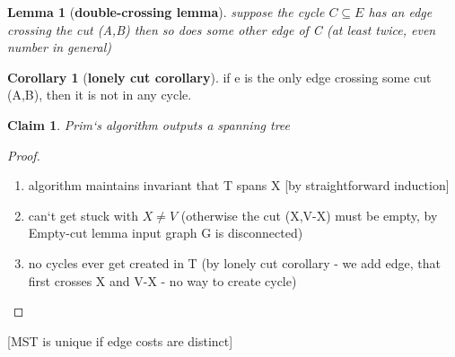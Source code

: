 \documentclass[a4paper,12pt]{article}
\theoremstyle{plain}
\newtheorem*{lemma}{Lemma}
\newtheorem{claim}{Claim}
\theoremstyle{definition}
\newtheorem*{corollary}{Corollary}
\theoremstyle{remark}
\begin{document}
\begin{lemma}[\textbf{double-crossing lemma}] suppose the cycle $C \subseteq E$ has an edge crossing the cut (A,B) then so does some other edge of C (at least twice, even number in general)\end{lemma}

\begin{corollary}[\textbf{lonely cut corollary}] if e is the only edge crossing some cut (A,B), then it is not in any cycle.\end{corollary}

\begin{claim} Prim`s algorithm outputs a spanning tree\end{claim}
\begin{proof}
\begin{enumerate}
	\item algorithm maintains invariant that T spans X [by straightforward induction]
	\item can`t get stuck with $X \neq V$ (otherwise the cut (X,V-X) must be empty, by Empty-cut lemma input graph G is disconnected)
	\item no cycles ever get created in T (by lonely cut corollary - we add edge, that first crosses X and V-X - no way to create cycle)
\end{enumerate}
\end{proof}

[MST is unique if edge costs are distinct]
\end{document}

